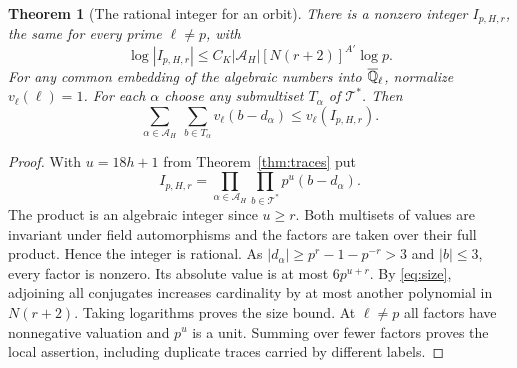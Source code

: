 \documentclass[a4paper,11pt]{article}
\newtheorem{theorem}[proposition]{Theorem}
\theoremstyle{definition}
\theoremstyle{remark}
\numberwithin{equation}{section}
\begin{document}
\begin{theorem}[The rational integer for an orbit]\leavevmode\label{thm:integer}
There is a nonzero integer \(I_{p,H,r}\), the same for every prime \(\ell\ne p\), with
\[
     \log |I_{p,H,r}|\le C_K|\mathcal A_H|[N(r+2)]^{A'}\log p .
\]
For any common embedding of the algebraic numbers into \(\overline{\mathbb Q}_\ell\), normalize \(v_\ell(\ell)=1\). For each \(\alpha\) choose any submultiset \(T_\alpha\) of \(\mathcal T^*\). Then
\[
  \sum_{\alpha\in\mathcal A_H}\ \sum_{b\in T_\alpha}
                 v_\ell(b-d_\alpha)\le v_\ell(I_{p,H,r}).
\]
\end{theorem}
\begin{proof}
With \(u=18h+1\) from Theorem~\ref{thm:traces} put
\[
 I_{p,H,r}=\prod_{\alpha\in\mathcal A_H}\prod_{b\in\mathcal T^*}
                    p^u(b-d_\alpha).
\]
The product is an algebraic integer since \(u\ge r\). Both multisets of values are invariant under field automorphisms and the factors are taken over their full product. Hence the integer is rational. As \(|d_\alpha|\ge p^r-1-p^{-r}>3\) and \(|b|\le3\), every factor is nonzero. Its absolute value is at most \(6p^{u+r}\). By \eqref{eq:size}, adjoining all conjugates increases cardinality by at most another polynomial in \(N(r+2)\). Taking logarithms proves the size bound. At \(\ell\ne p\) all factors have nonnegative valuation and \(p^u\) is a unit. Summing over fewer factors proves the local assertion, including duplicate traces carried by different labels.
\end{proof}
\end{document}

